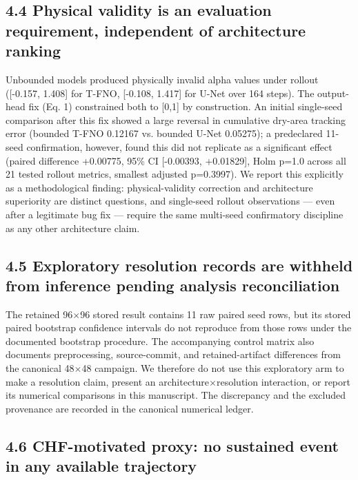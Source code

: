 \documentclass[preprint,12pt]{elsarticle}
\begin{document}
\subsection*{4.4 Physical validity is an evaluation requirement,
independent of architecture
ranking}\label{44-physical-validity-is-an-evaluation-requirement-independent-of-architecture-ranking}

Unbounded models produced physically invalid alpha values under rollout
({[}-0.157, 1.408{]} for T-FNO, {[}-0.108, 1.417{]} for U-Net over 164
steps). The output-head fix (Eq. 1) constrained both to {[}0,1{]} by
construction. An initial single-seed comparison after this fix showed a
large reversal in cumulative dry-area tracking error (bounded T-FNO
0.12167 vs. bounded U-Net 0.05275); a predeclared 11-seed confirmation,
however, found this did not replicate as a significant effect (paired
difference +0.00775, 95\% CI {[}-0.00393, +0.01829{]}, Holm p=1.0 across
all 21 tested rollout metrics, smallest adjusted p=0.3997). We report
this explicitly as a methodological finding: physical-validity
correction and architecture superiority are distinct questions, and
single-seed rollout observations --- even after a legitimate bug fix ---
require the same multi-seed confirmatory discipline as any other
architecture claim.

\subsection*{4.5 Exploratory resolution records are withheld from
inference pending analysis
reconciliation}\label{45-exploratory-resolution-records-are-withheld-from-inference-pending-analysis-reconciliation}

The retained 96\ensuremath{\times}96 stored result contains 11 raw paired seed rows, but
its stored paired bootstrap confidence intervals do not reproduce from
those rows under the documented bootstrap procedure. The accompanying
control matrix also documents preprocessing, source-commit, and
retained-artifact differences from the canonical 48\ensuremath{\times}48 campaign. We
therefore do not use this exploratory arm to make a resolution claim,
present an architecture\ensuremath{\times}resolution interaction, or report its numerical
comparisons in this manuscript. The discrepancy and the excluded
provenance are recorded in the canonical numerical ledger.

\subsection*{4.6 CHF-motivated proxy: no sustained event in any available
trajectory}\label{46-chf-motivated-proxy-no-sustained-event-in-any-available-trajectory}
\end{document}
